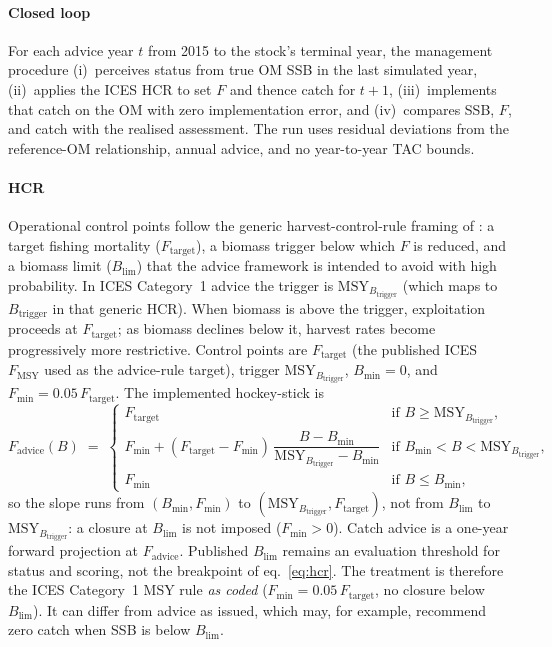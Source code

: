 \documentclass[11pt,a4paper]{article}
\newcommand{\Blim}{B_{\lim}}
\newcommand{\Btrig}{\mathrm{MSY}_{B_{\mathrm{trigger}}}}
\newcommand{\Ftar}{F_{\mathrm{target}}}
\begin{document}
\paragraph{Closed loop}
For each advice year $t$ from 2015 to the stock's terminal year, the
management procedure (i)~perceives status from true OM SSB in the last
simulated year, (ii)~applies the ICES HCR to set $F$ and thence catch for
$t{+}1$, (iii)~implements that catch on the OM with zero implementation
error, and (iv)~compares SSB, $F$, and catch with the realised
assessment. The run uses residual deviations from the reference-OM
relationship, annual advice, and no year-to-year TAC bounds.

\paragraph{HCR}
Operational control points follow the generic harvest-control-rule framing
of \citet{winker2026rebuilding}: a target fishing mortality ($\Ftar$), a
biomass trigger below which $F$ is reduced, and a biomass limit ($\Blim$)
that the advice framework is intended to avoid with high probability. In
ICES Category~1 advice the trigger is $\Btrig$ (which maps to
$B_{\mathrm{trigger}}$ in that generic HCR). When biomass is above the
trigger, exploitation proceeds at $\Ftar$; as biomass declines below it,
harvest rates become progressively more restrictive. Control points are
$\Ftar$ (the published ICES $F_{\mathrm{MSY}}$ used as the advice-rule
target), trigger $\Btrig$, $B_{\min}=0$, and
$F_{\min}=0.05\,\Ftar$. The implemented hockey-stick is
\begin{equation}
  F_{\mathrm{advice}}(B)
  \;=\;
  \begin{cases}
  \Ftar
    & \text{if } B \ge \Btrig,\\[0.35em]
  F_{\min}
    + (\Ftar - F_{\min})\,
      \dfrac{B - B_{\min}}{\Btrig - B_{\min}}
    & \text{if } B_{\min} < B < \Btrig,\\[0.75em]
  F_{\min}
    & \text{if } B \le B_{\min},
  \end{cases}
  \label{eq:hcr}
\end{equation}
so the slope runs from $(B_{\min},F_{\min})$ to $(\Btrig,\Ftar)$, not from
$\Blim$ to $\Btrig$: a closure at $\Blim$ is not imposed ($F_{\min}>0$).
Catch advice is a one-year forward projection at $F_{\mathrm{advice}}$.
Published $\Blim$ remains an evaluation threshold for status and scoring,
not the breakpoint of eq.~\eqref{eq:hcr}. The treatment is therefore the
ICES Category~1 MSY rule \emph{as coded} ($F_{\min}=0.05\,\Ftar$, no
closure below $\Blim$). It can differ from advice as issued, which may,
for example, recommend zero catch when SSB is below $\Blim$.
\end{document}
